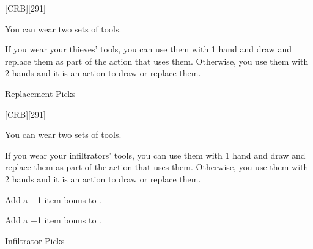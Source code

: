 

[CRB][291]

{\footnotesize
You can wear two sets of tools.

If you wear your thieves' tools, you can use them with 1 hand and draw and replace them as part of the action that uses them.
Otherwise, you use them with 2 hands and it is an action to draw or replace them.
}


Replacement Picks \ItemPrice{3sp}

\vfill



[CRB][291]

{\footnotesize
You can wear two sets of tools.

If you wear your infiltrators' tools, you can use them with 1 hand and draw and replace them as part of the action that uses them.
Otherwise, you use them with 2 hands and it is an action to draw or replace them.
}


Add a +1 item bonus to .


Add a +1 item bonus to .

Infiltrator Picks 

\vfill


